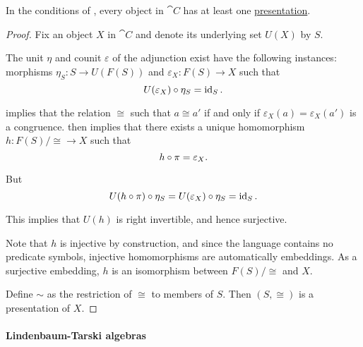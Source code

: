 \begin{proposition}\label{thm:object_presentation_existence}
  In the conditions of , every object in \( \cat{C} \) has at least one \hyperref[def:object_presentation]{presentation}.
\end{proposition}
\begin{proof}
  Fix an object \( X \) in \( \cat{C} \) and denote its underlying set \( U(X) \) by \( S \).

  The unit \( \eta \) and counit \( \varepsilon \) of the adjunction exist have the following instances: morphisms \( \eta_S: S \to U(F(S)) \) and \( \varepsilon_X: F(S) \to X \) such that
  \begin{equation*}
    U(\varepsilon_X) \bincirc \eta_S = \id_S.
  \end{equation*}

   implies that the relation \( {\cong} \) such that \( a \cong a' \) if and only if \( \varepsilon_X(a) = \varepsilon_X(a') \) is a congruence.  then implies that there exists a unique homomorphism \( h: F(S) / {\cong} \to X \) such that
  \begin{equation*}
    h \bincirc \pi = \varepsilon_X.
  \end{equation*}

  But
  \begin{equation*}
    U(h \bincirc \pi) \bincirc \eta_S = U(\varepsilon_X) \bincirc \eta_S = \id_S.
  \end{equation*}

  This implies that \( U(h) \) is right invertible, and hence surjective.

  Note that \( h \) is injective by construction, and since the language contains no predicate symbols, injective homomorphisms are automatically embeddings. As a surjective embedding, \( h \) is an isomorphism between \( F(S) / {\cong} \) and \( X \).

  Define \( {\sim} \) as the restriction of \( {\cong} \) to members of \( S \). Then \( (S, \cong) \) is a presentation of \( X \).
\end{proof}

\paragraph{Lindenbaum-Tarski algebras}

